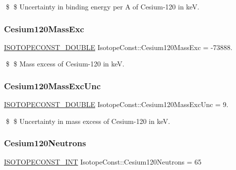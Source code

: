 \$ \$ Uncertainty in binding energy per A of Cesium-\/120 in keV. \mbox{\label{group___isotope_const-_cesium-_cs120_ga74077eaa1f0ed5d16476f940cced7616}} 
\subsubsection{\texorpdfstring{Cesium120\+Mass\+Exc}{Cesium120MassExc}}
{\footnotesize\ttfamily \mbox{\hyperlink{group___isotope_const-_macros_ga8f45a7272ce02c0b4c65c44636ed719a}{I\+S\+O\+T\+O\+P\+E\+C\+O\+N\+S\+T\+\_\+\+D\+O\+U\+B\+LE}} Isotope\+Const\+::\+Cesium120\+Mass\+Exc = -\/73888.}

\$ \$ Mass excess of Cesium-\/120 in keV. \mbox{\label{group___isotope_const-_cesium-_cs120_gaf2513e99e06e1eb9a096e76bd0364ef9}} 
\subsubsection{\texorpdfstring{Cesium120\+Mass\+Exc\+Unc}{Cesium120MassExcUnc}}
{\footnotesize\ttfamily \mbox{\hyperlink{group___isotope_const-_macros_ga8f45a7272ce02c0b4c65c44636ed719a}{I\+S\+O\+T\+O\+P\+E\+C\+O\+N\+S\+T\+\_\+\+D\+O\+U\+B\+LE}} Isotope\+Const\+::\+Cesium120\+Mass\+Exc\+Unc = 9.}

\$ \$ Uncertainty in mass excess of Cesium-\/120 in keV. \mbox{\label{group___isotope_const-_cesium-_cs120_gacf15987f980cf88f35f2890f6a09b06c}} 
\subsubsection{\texorpdfstring{Cesium120\+Neutrons}{Cesium120Neutrons}}
{\footnotesize\ttfamily \mbox{\hyperlink{group___isotope_const-_macros_ga5f18360b3e99483a35c32d789e62621c}{I\+S\+O\+T\+O\+P\+E\+C\+O\+N\+S\+T\+\_\+\+I\+NT}} Isotope\+Const\+::\+Cesium120\+Neutrons = 65}

